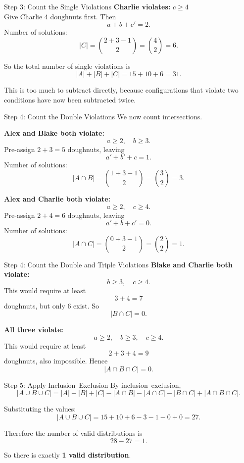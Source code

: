 \begin{frame}{Step 3: Count the Single Violations}
  \textbf{Charlie violates:} $c \ge 4$\\
  Give Charlie $4$ doughnuts first. Then
  \[
    a+b+c' = 2.
  \]
  Number of solutions:
  \[
    |C| = \binom{2+3-1}{2} = \binom{4}{2} = 6.
  \]

  \vspace{0.8em}

  So the total number of single violations is
  \[
    |A|+|B|+|C| = 15+10+6 = 31.
  \]

  This is too much to subtract directly, because configurations that violate
  two conditions have now been subtracted twice.
\end{frame}

\begin{frame}{Step 4: Count the Double Violations}
  We now count intersections.

  \vspace{0.5em}

  \textbf{Alex and Blake both violate:}
  \[
    a \ge 2,\quad b \ge 3.
  \]
  Pre-assign $2+3=5$ doughnuts, leaving
  \[
    a'+b'+c = 1.
  \]
  Number of solutions:
  \[
    |A \cap B| = \binom{1+3-1}{2} = \binom{3}{2} = 3.
  \]

  \vspace{0.8em}

  \textbf{Alex and Charlie both violate:}
  \[
    a \ge 2,\quad c \ge 4.
  \]
  Pre-assign $2+4=6$ doughnuts, leaving
  \[
    a'+b+c' = 0.
  \]
  Number of solutions:
  \[
    |A \cap C| = \binom{0+3-1}{2} = \binom{2}{2} = 1.
  \]
\end{frame}

\begin{frame}{Step 4: Count the Double and Triple Violations}
  \textbf{Blake and Charlie both violate:}
  \[
    b \ge 3,\quad c \ge 4.
  \]
  This would require at least
  \[
    3+4=7
  \]
  doughnuts, but only $6$ exist. So
  \[
    |B \cap C| = 0.
  \]

  \vspace{0.8em}

  \textbf{All three violate:}
  \[
    a \ge 2,\quad b \ge 3,\quad c \ge 4.
  \]
  This would require at least
  \[
    2+3+4=9
  \]
  doughnuts, also impossible. Hence
  \[
    |A \cap B \cap C| = 0.
  \]
\end{frame}

\begin{frame}{Step 5: Apply Inclusion--Exclusion}
  By inclusion--exclusion,
  \[
    |A \cup B \cup C|
    =
    |A|+|B|+|C|
    -
    |A \cap B|
    -
    |A \cap C|
    -
    |B \cap C|
    +
    |A \cap B \cap C|.
  \]

  Substituting the values:
  \[
    |A \cup B \cup C|
    =
    15+10+6-3-1-0+0 = 27.
  \]

  Therefore the number of valid distributions is
  \[
    28 - 27 = 1.
  \]

  \vspace{0.5em}

  So there is exactly \textbf{1 valid distribution}.
\end{frame}


